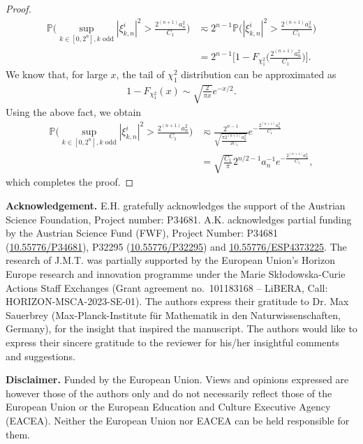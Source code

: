 \documentclass[english,a4paper,11pt]{amsart}
\theoremstyle{plain}
\theoremstyle{definition}
\theoremstyle{remark}
\numberwithin{equation}{section}
\renewcommand{\P}{\mathbb{P}}
\begin{document}
\begin{appendix}
\begin{proof}
 \begin{align*}
 	\P\Big(\sup_{k\in[0,2^n],k\text{ odd}}|\xi_{k,n}^i|^2>  \frac{2^{(n+1)}a_n^2}{C_1}\Big)&\eqsim 
 	2^{n-1}	\P\bigg(|\xi_{k,n}^i|^2> \frac{2^{(n+1)}a_n^2}{C_1}\bigg) 	\\&= 2^{n-1}\bigg[1-F_{\chi_1^2}\Big(\frac{2^{(n+1)}a_n^2}{C_1}\Big)\bigg]. 
 \end{align*}We know that, for large $x$, the tail of $\chi_1^2$ distribution can be approximated as 
\begin{align*}
	1-F_{\chi_1^2}(x)\sim \sqrt{\frac{2}{\pi x}}e^{-x/2}.
\end{align*}Using the above fact, we obtain 
 \begin{align*}
	\P\Big(\sup_{k\in[0,2^n],k\text{ odd}}|\xi_{k,n}^i|^2>  \frac{2^{(n+1)}a_n^2}{C_1}\Big)&\eqsim 
	\frac{2^{n-1}}{\sqrt{ \frac{\pi 2^{(n+1)}a_n^2}{2C_1}}}e^{-\frac{2^{(n+1)}a_n^2}{C_1}}\\&=
	\sqrt{\frac{C_1}{\pi} }2^{n/2-1}a_n^{-1}e^{-\frac{2^{(n+1)}a_n^2}{C_1}},
\end{align*}which completes the proof.
\end{proof}
\end{appendix}



%
%
%
%
%


\noindent
\textbf{Acknowledgement.} E.H. gratefully acknowledges the support of the Austrian Science Foundation, Project
number: P34681. A.K. acknowledges partial funding by the Austrian Science Fund (FWF), Project
Number: P34681 (\href{https://www.fwf.ac.at/en/research-radar/10.55776/P34681}{10.55776/P34681}), P32295 (\href{https://www.fwf.ac.at/en/research-radar/10.55776/P32295}{10.55776/P32295}) and \href{https://www.fwf.ac.at/forschungsradar/10.55776/ESP4373225}{10.55776/ESP4373225}.
The research of J.M.T. was partially supported by the European Union's Horizon Europe research and innovation programme under the Marie Sk\l{}odowska-Curie Actions Staff Exchanges (Grant agreement no.~101183168 -- LiBERA, Call: HORIZON-MSCA-2023-SE-01). The authors express
their gratitude to Dr. Max Sauerbrey (Max-Planck-Institute f\"ur Mathematik in den Naturwissenschaften, Germany), for the insight that inspired the manuscript. The
authors would like to express their sincere gratitude to the reviewer for his/her
insightful comments and suggestions.

\noindent
\textbf{Disclaimer.}
Funded by the European Union. Views and opinions expressed are however those of the authors only and do not necessarily reflect those of
the European Union or the European Education and Culture Executive Agency (EACEA). Neither the European Union nor EACEA can be held responsible for them.
\end{document}
